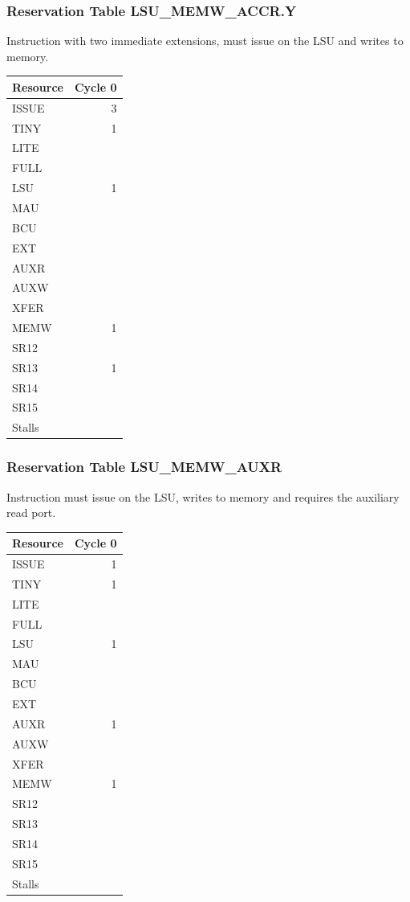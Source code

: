 \subsubsection{Reservation Table LSU\_MEMW\_ACCR.Y} \label{sec:reservation-LSU-MEMW-ACCR.Y}

Instruction with two immediate extensions, must issue on the LSU and writes to memory.
\medskip

\begin{tabular}{|l|r|} \hline
Resource	& Cycle 0 \\ \hline
\textsf{ISSUE}	& 3	\\
\textsf{TINY}	& 1	\\
\textsf{LITE}	& 	\\
\textsf{FULL}	& 	\\
\textsf{LSU}	& 1	\\
\textsf{MAU}	& 	\\
\textsf{BCU}	& 	\\
\textsf{EXT}	& 	\\
\textsf{AUXR}	& 	\\
\textsf{AUXW}	& 	\\
\textsf{XFER}	& 	\\
\textsf{MEMW}	& 1	\\
\textsf{SR12}	& 	\\
\textsf{SR13}	& 1	\\
\textsf{SR14}	& 	\\
\textsf{SR15}	& 	\\
\hline Stalls	& 	\\
\hline \end{tabular}

\subsubsection{Reservation Table LSU\_MEMW\_AUXR} \label{sec:reservation-LSU-MEMW-AUXR}

Instruction must issue on the LSU, writes to memory and requires the auxiliary read port.
\medskip

\begin{tabular}{|l|r|} \hline
Resource	& Cycle 0 \\ \hline
\textsf{ISSUE}	& 1	\\
\textsf{TINY}	& 1	\\
\textsf{LITE}	& 	\\
\textsf{FULL}	& 	\\
\textsf{LSU}	& 1	\\
\textsf{MAU}	& 	\\
\textsf{BCU}	& 	\\
\textsf{EXT}	& 	\\
\textsf{AUXR}	& 1	\\
\textsf{AUXW}	& 	\\
\textsf{XFER}	& 	\\
\textsf{MEMW}	& 1	\\
\textsf{SR12}	& 	\\
\textsf{SR13}	& 	\\
\textsf{SR14}	& 	\\
\textsf{SR15}	& 	\\
\hline Stalls	& 	\\
\hline \end{tabular}

